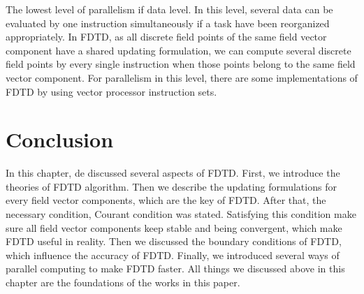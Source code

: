 The lowest level of parallelism if data level. In this level, several data can be evaluated by one instruction simultaneously if a task have been reorganized appropriately. In FDTD, as all discrete field points of the same field vector component have a shared updating formulation, we can compute several discrete field points by every single instruction when those points belong to the same field vector component. For parallelism in this level, there are some implementations of FDTD by using vector processor instruction sets.

\section{Conclusion}
In this chapter, de discussed several aspects of FDTD. First, we introduce the theories of FDTD algorithm. Then we describe the updating formulations for every field vector components, which are the key of FDTD. After that, the necessary condition, Courant condition was stated. Satisfying this condition make sure all field vector components keep stable and being convergent, which make FDTD useful in reality. Then we discussed the boundary conditions of FDTD, which influence the accuracy of FDTD. Finally, we introduced several ways of parallel computing to make FDTD faster. All things we discussed above in this chapter are the foundations of the works in this paper.